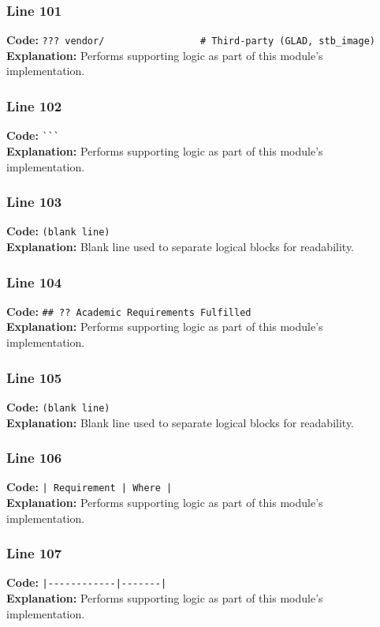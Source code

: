 \documentclass[11pt,a4paper]{article}
\begin{document}
\subsubsection*{Line 101}
\textbf{Code:} \verb|??? vendor/                 # Third-party (GLAD, stb_image)|\\
\textbf{Explanation:} Performs supporting logic as part of this module's implementation.

\subsubsection*{Line 102}
\textbf{Code:} \verb|```|\\
\textbf{Explanation:} Performs supporting logic as part of this module's implementation.

\subsubsection*{Line 103}
\textbf{Code:} \texttt{(blank line)}\\
\textbf{Explanation:} Blank line used to separate logical blocks for readability.

\subsubsection*{Line 104}
\textbf{Code:} \verb|## ?? Academic Requirements Fulfilled|\\
\textbf{Explanation:} Performs supporting logic as part of this module's implementation.

\subsubsection*{Line 105}
\textbf{Code:} \texttt{(blank line)}\\
\textbf{Explanation:} Blank line used to separate logical blocks for readability.

\subsubsection*{Line 106}
\textbf{Code:} \verb!| Requirement | Where |!\\
\textbf{Explanation:} Performs supporting logic as part of this module's implementation.

\subsubsection*{Line 107}
\textbf{Code:} \verb!|------------|-------|!\\
\textbf{Explanation:} Performs supporting logic as part of this module's implementation.
\end{document}
